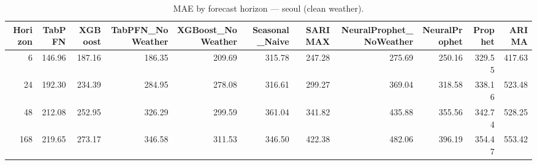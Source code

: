 \begin{table}[ht!]
\centering
\caption{MAE by forecast horizon — seoul (clean weather).}
\label{tab:mae_by_horizon_seoul}
\begin{tabular}{rrrrrrrrrrr}
\toprule
Horizon & TabPFN & XGBoost & TabPFN\_NoWeather & XGBoost\_NoWeather & Seasonal\_Naive & SARIMAX & NeuralProphet\_NoWeather & NeuralProphet & Prophet & ARIMA \\
\midrule
6 & 146.96 & 187.16 & 186.35 & 209.69 & 315.78 & 247.28 & 275.69 & 250.16 & 329.55 & 417.63 \\
24 & 192.30 & 234.39 & 284.95 & 278.08 & 316.61 & 299.27 & 369.04 & 318.58 & 338.16 & 523.48 \\
48 & 212.08 & 252.95 & 326.29 & 299.59 & 361.04 & 341.82 & 435.88 & 355.56 & 342.74 & 528.25 \\
168 & 219.65 & 273.17 & 346.58 & 311.53 & 346.50 & 422.38 & 482.06 & 396.19 & 354.47 & 553.42 \\
\bottomrule
\end{tabular}
\end{table}
